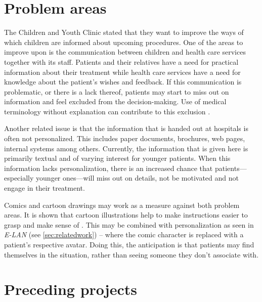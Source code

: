 \section{Problem areas}
\label{sec:problemareas}

The Children and Youth Clinic stated that they want to improve the ways of which children are informed about upcoming procedures. One of the areas to improve upon is the communication between children and health care services together with its staff. Patients and their relatives have a need for practical information about their treatment while health care services have a need for knowledge about the patient's wishes and feedback. If this communication is problematic, or there is a lack thereof, patients may start to miss out on information and feel excluded from the decision-making. Use of medical terminology without explanation can contribute to this exclusion \autocite{coyne2006}.

Another related issue is that the information that is handed out at hospitals is often not personalized. This includes paper documents, brochures, web pages, internal systems among others. Currently, the information that is given here is primarily textual and of varying interest for younger patients. When this information lacks personalization, there is an increased chance that patients---especially younger ones---will miss out on details, not be motivated and not engage in their treatment.

Comics and cartoon drawings may work as a measure against both problem areas. It is shown that cartoon illustrations help to make instructions easier to grasp and make sense of \autocite{delp1996}. This may be combined with personalization as seen in \emph{E-LAN} (see \autoref{sec:relatedwork}) -- where the comic character is replaced with a patient's respective avatar. Doing this, the anticipation is that patients may find themselves in the situation, rather than seeing someone they don't associate with.


\section{Preceding projects}

